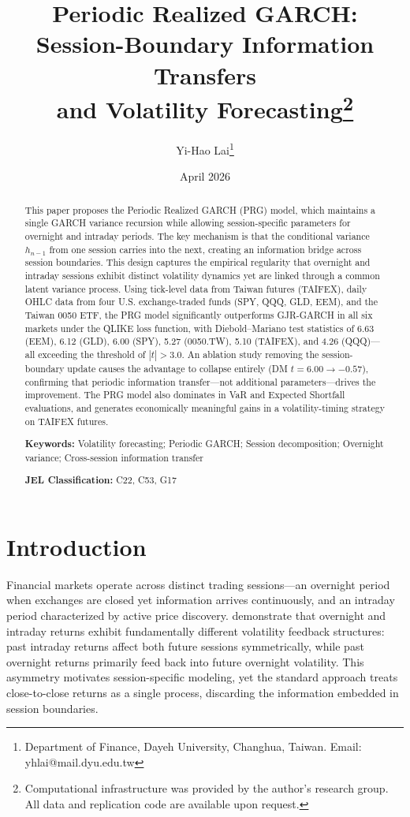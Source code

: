 \documentclass[11pt,a4paper]{article}
\title{Periodic Realized GARCH: \\ Session-Boundary Information Transfers \\ and Volatility Forecasting\thanks{%
Computational infrastructure was provided by the author's research group.
All data and replication code are available upon request.}}
\author{Yi-Hao Lai\thanks{%
Department of Finance, Dayeh University, Changhua, Taiwan.
Email: yhlai@mail.dyu.edu.tw}}
\date{April 2026}
\begin{document}
\maketitle

\begin{abstract}
This paper proposes the Periodic Realized GARCH (PRG) model, which maintains a single GARCH variance recursion while allowing session-specific parameters for overnight and intraday periods. The key mechanism is that the conditional variance $h_{n-1}$ from one session carries into the next, creating an information bridge across session boundaries. This design captures the empirical regularity that overnight and intraday sessions exhibit distinct volatility dynamics yet are linked through a common latent variance process. Using tick-level data from Taiwan futures (TAIFEX), daily OHLC data from four U.S. exchange-traded funds (SPY, QQQ, GLD, EEM), and the Taiwan 0050 ETF, the PRG model significantly outperforms GJR-GARCH in all six markets under the QLIKE loss function, with Diebold--Mariano test statistics of 6.63 (EEM), 6.12 (GLD), 6.00 (SPY), 5.27 (0050.TW), 5.10 (TAIFEX), and 4.26 (QQQ)---all exceeding the \citet{Harvey2016} threshold of $|t|>3.0$. An ablation study removing the session-boundary update causes the advantage to collapse entirely (DM $t = 6.00 \to -0.57$), confirming that periodic information transfer---not additional parameters---drives the improvement. The PRG model also dominates in VaR and Expected Shortfall evaluations, and generates economically meaningful gains in a volatility-timing strategy on TAIFEX futures.

\medskip\noindent
\textbf{Keywords:} Volatility forecasting; Periodic GARCH; Session decomposition; Overnight variance; Cross-session information transfer

\medskip\noindent
\textbf{JEL Classification:} C22, C53, G17
\end{abstract}

\newpage

\section{Introduction}

Financial markets operate across distinct trading sessions---an overnight period when exchanges are closed yet information arrives continuously, and an intraday period characterized by active price discovery. \citet{Blanc2014} demonstrate that overnight and intraday returns exhibit fundamentally different volatility feedback structures: past intraday returns affect both future sessions symmetrically, while past overnight returns primarily feed back into future overnight volatility. This asymmetry motivates session-specific modeling, yet the standard approach treats close-to-close returns as a single process, discarding the information embedded in session boundaries.
\end{document}
